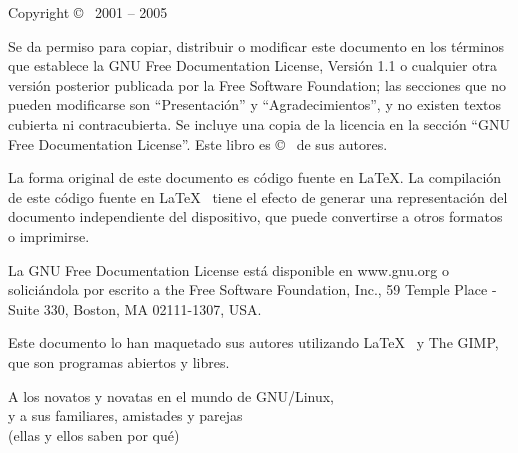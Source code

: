 
\vfill
\clearpage

\vspace*{130mm}
\noindent Copyright  \copyright~ 2001 -- 2005 \GULiC
\vspace*{5mm}

\noindent  Se da  permiso  para copiar,  distribuir  o modificar  este
documento  en los  términos que  establece la  GNU Free  Documentation
License, Versión 1.1 o cualquier  otra versión posterior publicada por
la Free Software  Foundation; las secciones que  no pueden modificarse
son  ``Presentación''  y  ``Agradecimientos'',  y  no  existen  textos
cubierta ni contracubierta. Se incluye una  copia de la licencia en la
sección ``GNU Free Documentation  License''. Este libro es \copyright~
de sus autores.

\noindent  La forma  original de  este documento  es código  fuente en
\LaTeX.  La compilación  de este  código  fuente en  \LaTeX~ tiene  el
efecto de  generar una representación del  documento independiente del
dispositivo, que puede convertirse a otros formatos o imprimirse.

\noindent  La  GNU  Free  Documentation  License  está  disponible  en
www.gnu.org o soliciándola por escrito a the Free Software Foundation,
Inc., 59 Temple Place - Suite 330, Boston, MA 02111-1307, USA.

\noindent  Este  documento lo  han  maquetado  sus autores  utilizando
\LaTeX~ y {\sf The GIMP}, que son programas abiertos y libres.

\vfill
\clearpage

\vspace*{35mm}
\begin{flushright}
{\large A los novatos y novatas en el mundo de GNU/Linux, \\
y a sus familiares, amistades y parejas} \\
{\small (ellas y ellos saben por qué)}
\end{flushright}

\vfill
\cleardoublepage

\pagestyle{fancy}
